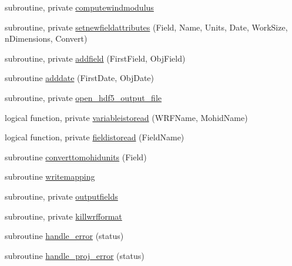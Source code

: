 \begin{DoxyCompactItemize}
\item 
subroutine, private \mbox{\hyperlink{namespacemodulewrfformat_a5ebdc8cdb7d4fca10d2727e8b5b542ce}{computewindmodulus}}
\item 
subroutine, private \mbox{\hyperlink{namespacemodulewrfformat_a2b4e995c72ac3a14b042542f4fe14c13}{setnewfieldattributes}} (Field, Name, Units, Date, Work\+Size, n\+Dimensions, Convert)
\item 
subroutine, private \mbox{\hyperlink{namespacemodulewrfformat_a4fec880c8102aff05f702538868fa928}{addfield}} (First\+Field, Obj\+Field)
\item 
subroutine \mbox{\hyperlink{namespacemodulewrfformat_a12d896f60aea7c34ec138f259778fcd0}{adddate}} (First\+Date, Obj\+Date)
\item 
subroutine, private \mbox{\hyperlink{namespacemodulewrfformat_a477dfcb5abd2d3fef1a7de09f09e0216}{open\+\_\+hdf5\+\_\+output\+\_\+file}}
\item 
logical function, private \mbox{\hyperlink{namespacemodulewrfformat_a39704adb6d59858e48b9581c11a17870}{variableistoread}} (W\+R\+F\+Name, Mohid\+Name)
\item 
logical function, private \mbox{\hyperlink{namespacemodulewrfformat_a3825823eb49a783934b2270b44729863}{fieldistoread}} (Field\+Name)
\item 
subroutine \mbox{\hyperlink{namespacemodulewrfformat_a9a0d0071658920421e26356debdbac89}{converttomohidunits}} (Field)
\item 
subroutine \mbox{\hyperlink{namespacemodulewrfformat_a2d9d50bc96864ebc8514152b797f5465}{writemapping}}
\item 
subroutine, private \mbox{\hyperlink{namespacemodulewrfformat_acba548a01d7e2ba1276dc6da267132ff}{outputfields}}
\item 
subroutine, private \mbox{\hyperlink{namespacemodulewrfformat_a5b240148e53caa6048e5a298bb4b0376}{killwrfformat}}
\item 
subroutine \mbox{\hyperlink{namespacemodulewrfformat_a00cdab997f51c9c9b8bf3a5b45ff8969}{handle\+\_\+error}} (status)
\item 
subroutine \mbox{\hyperlink{namespacemodulewrfformat_ae7878b44cc094aa060425acf8605dc33}{handle\+\_\+proj\+\_\+error}} (status)
\end{DoxyCompactItemize}
